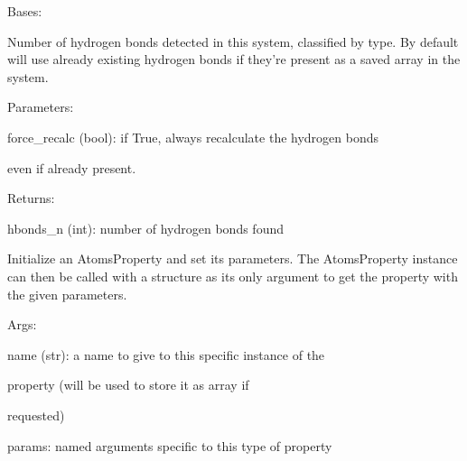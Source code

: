 \documentclass[letterpaper,10pt,english]{sphinxmanual}
\begin{document}
\begin{fulllineitems}
\label{doctree/soprano.properties.linkage.linkage:soprano.properties.linkage.linkage.HydrogenBondsNumber}
Bases: {\hyperref[doctree/soprano.properties.atomsproperty:soprano.properties.atomsproperty.AtomsProperty]{\emph{}}}

Number of hydrogen bonds detected in this system, classified by type.
By default will use already existing hydrogen bonds if they're present as
a saved array in the system.

\begin{DUlineblock}{0em}
\item[] Parameters:
\item[]
\begin{DUlineblock}{\DUlineblockindent}
\item[] force\_recalc (bool): if True, always recalculate the hydrogen bonds
\item[]
\begin{DUlineblock}{\DUlineblockindent}
\item[] even if already present.
\end{DUlineblock}
\end{DUlineblock}
\end{DUlineblock}

\begin{DUlineblock}{0em}
\item[] Returns:
\item[]
\begin{DUlineblock}{\DUlineblockindent}
\item[] hbonds\_n (int): number of hydrogen bonds found
\end{DUlineblock}
\end{DUlineblock}

Initialize an AtomsProperty and set its parameters.
The AtomsProperty instance can then be called with a structure as its
only argument to get the property with the given parameters.

\begin{DUlineblock}{0em}
\item[] Args:
\item[]
\begin{DUlineblock}{\DUlineblockindent}
\item[] name (str): a name to give to this specific instance of the
\item[]
\begin{DUlineblock}{\DUlineblockindent}
\item[] property (will be used to store it as array if
\item[] requested)
\end{DUlineblock}
\item[] params: named arguments specific to this type of property
\end{DUlineblock}
\end{DUlineblock}


\end{fulllineitems}
\end{document}
